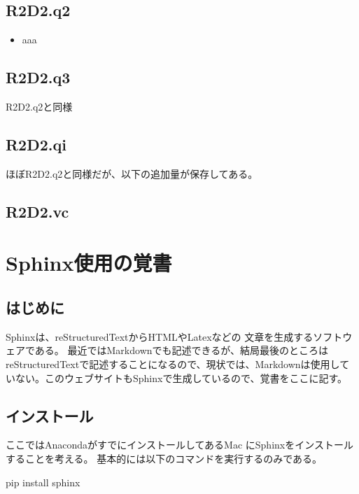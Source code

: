 \documentclass[letterpaper,10pt,dvipdfmx,report]{sphinxmanual}
\begin{document}
\section{R2D2.q2}
\label{\detokenize{notation:r2d2-q2}}\begin{itemize}
\item {} 
aaa

\end{itemize}


\section{R2D2.q3}
\label{\detokenize{notation:r2d2-q3}}
R2D2.q2と同様


\section{R2D2.qi}
\label{\detokenize{notation:r2d2-qi}}
ほぼR2D2.q2と同様だが、以下の追加量が保存してある。


\section{R2D2.vc}
\label{\detokenize{notation:r2d2-vc}}

\chapter{Sphinx使用の覚書}
\label{\detokenize{sphinx:sphinx}}\label{\detokenize{sphinx::doc}}

\section{はじめに}
\label{\detokenize{sphinx:id1}}
Sphinxは、reStructuredTextからHTMLやLatexなどの
文章を生成するソフトウェアである。
最近ではMarkdownでも記述できるが、結局最後のところはreStructuredTextで記述することになるので、現状では、Markdownは使用していない。このウェブサイトもSphinxで生成しているので、覚書をここに記す。


\section{インストール}
\label{\detokenize{sphinx:id3}}
ここではAnacondaがすでにインストールしてあるMac
にSphinxをインストールすることを考える。
基本的には以下のコマンドを実行するのみである。

\begin{sphinxVerbatim}[commandchars=\\\{\}]
pip install sphinx
\end{sphinxVerbatim}
\end{document}
